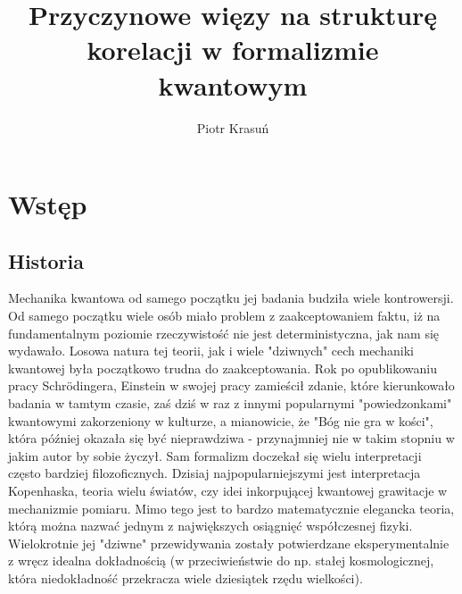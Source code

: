 \documentclass[10pt]{article} %
\title{Przyczynowe więzy na strukturę korelacji w formalizmie kwantowym}
\author{Piotr Krasuń}
\begin{document}
\maketitle
\tableofcontents
\newpage
\listoffigures
\listoftables
\newpage
\section{Wstęp}
\subsection{Historia}
Mechanika kwantowa od samego początku jej badania budziła wiele kontrowersji. Od samego początku wiele osób miało problem z zaakceptowaniem faktu, iż
na fundamentalnym poziomie rzeczywistość nie jest deterministyczna, jak nam się wydawało. Losowa natura tej teorii, jak i wiele "dziwnych" cech mechaniki kwantowej była początkowo trudna do zaakceptowania. Rok po opublikowaniu pracy Schrödingera, Einstein w swojej pracy zamieścił zdanie, które kierunkowało badania w tamtym czasie, zaś dziś w raz z innymi popularnymi "powiedzonkami" kwantowymi zakorzeniony w kulturze, a mianowicie, że "Bóg nie gra w kości", która później okazała się być nieprawdziwa - przynajmniej nie w takim stopniu w jakim autor by sobie życzył. Sam formalizm doczekał się wielu interpretacji często bardziej filozoficznych. Dzisiaj najpopularniejszymi jest interpretacja Kopenhaska, teoria wielu światów, czy idei inkorpującej kwantowej grawitacje w mechanizmie pomiaru. Mimo tego jest to bardzo matematycznie elegancka teoria, którą można nazwać jednym z największych osiągnięć współczesnej fizyki. Wielokrotnie jej "dziwne" przewidywania zostały potwierdzane eksperymentalnie z wręcz idealna dokładnością (w przeciwieństwie do np. stałej kosmologicznej, która niedokładność przekracza wiele dziesiątek rzędu wielkości). 
\end{document}
